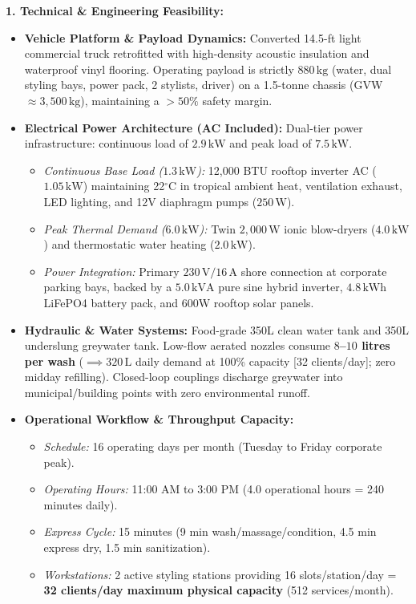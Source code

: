 \documentclass[10.5pt,a4paper]{article}
\begin{document}
\textbf{1. Technical \& Engineering Feasibility:}
\begin{itemize}[leftmargin=1.2em, itemsep=0.06em]
    \item \textbf{Vehicle Platform \& Payload Dynamics:} Converted 14.5-ft light commercial truck retrofitted with high-density acoustic insulation and waterproof vinyl flooring. Operating payload is strictly \textbf{$880\,\text{kg}$} (water, dual styling bays, power pack, 2 stylists, driver) on a 1.5-tonne chassis (GVW $\approx 3,500\,\text{kg}$), maintaining a $>50\%$ safety margin.
    \item \textbf{Electrical Power Architecture (AC Included):} Dual-tier power infrastructure: continuous load of \textbf{$2.9\,\text{kW}$} and peak load of \textbf{$7.5\,\text{kW}$}.
    \begin{itemize}[leftmargin=1.2em, itemsep=0.03em]
        \item \textit{Continuous Base Load ($1.3\,\text{kW}$):} 12,000 BTU rooftop inverter AC ($1.05\,\text{kW}$) maintaining 22$^\circ$C in tropical ambient heat, ventilation exhaust, LED lighting, and 12V diaphragm pumps ($250\,\text{W}$).
        \item \textit{Peak Thermal Demand ($6.0\,\text{kW}$):} Twin $2,000\,\text{W}$ ionic blow-dryers ($4.0\,\text{kW}$) and thermostatic water heating ($2.0\,\text{kW}$).
        \item \textit{Power Integration:} Primary $230\,\text{V}/16\,\text{A}$ shore connection at corporate parking bays, backed by a $5.0\,\text{kVA}$ pure sine hybrid inverter, $4.8\,\text{kWh}$ LiFePO4 battery pack, and 600W rooftop solar panels.
    \end{itemize}
    \item \textbf{Hydraulic \& Water Systems:} Food-grade 350L clean water tank and 350L underslung greywater tank. Low-flow aerated nozzles consume \textbf{$8$--$10$ litres per wash} ($\implies 320\,\text{L}$ daily demand at 100\% capacity [32 clients/day]; zero midday refilling). Closed-loop couplings discharge greywater into municipal/building points with zero environmental runoff.
    \item \textbf{Operational Workflow \& Throughput Capacity:}
    \begin{itemize}[leftmargin=1.2em, itemsep=0.03em]
        \item \textit{Schedule:} 16 operating days per month (Tuesday to Friday corporate peak).
        \item \textit{Operating Hours:} 11:00 AM to 3:00 PM (4.0 operational hours = 240 minutes daily).
        \item \textit{Express Cycle:} 15 minutes (9 min wash/massage/condition, 4.5 min express dry, 1.5 min sanitization).
        \item \textit{Workstations:} 2 active styling stations providing 16 slots/station/day = \textbf{32 clients/day maximum physical capacity} (512 services/month).
    \end{itemize}
\end{itemize}
\end{document}
